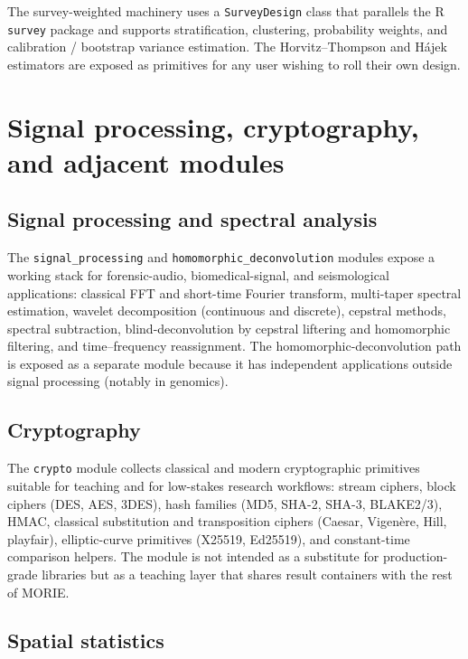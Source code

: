\documentclass[11pt,a4paper]{article}
\theoremstyle{plain}
\theoremstyle{definition}
\theoremstyle{remark}
\begin{document}
The survey-weighted machinery uses a \texttt{SurveyDesign} class
that parallels the R \texttt{survey} package
\cite{Lumley2010ComplexSurveys} and supports
stratification, clustering, probability weights, and
calibration / bootstrap variance estimation. The
Horvitz--Thompson and H\'ajek estimators are exposed as primitives
for any user wishing to roll their own design.

\section{Signal processing, cryptography, and adjacent modules}
\label{sec:adjacent}

\subsection{Signal processing and spectral analysis}

The \texttt{signal\_processing} and
\texttt{homomorphic\_deconvolution} modules expose a working stack
for forensic-audio, biomedical-signal, and seismological
applications: classical FFT and short-time Fourier transform,
multi-taper spectral estimation, wavelet decomposition (continuous
and discrete), cepstral methods, spectral subtraction,
blind-deconvolution by cepstral liftering and homomorphic
filtering, and time--frequency reassignment. The
homomorphic-deconvolution path is exposed as a separate module
because it has independent applications outside signal processing
(notably in genomics).

\subsection{Cryptography}

The \texttt{crypto} module collects classical and modern
cryptographic primitives suitable for teaching and for low-stakes
research workflows: stream ciphers, block ciphers (DES, AES, 3DES),
hash families (MD5, SHA-2, SHA-3, BLAKE2/3), HMAC, classical
substitution and transposition ciphers (Caesar, Vigen\`ere, Hill,
playfair), elliptic-curve primitives (X25519, Ed25519), and
constant-time comparison helpers. The module is not intended as a
substitute for production-grade libraries but as a teaching layer
that shares result containers with the rest of MORIE.

\subsection{Spatial statistics}
\end{document}
